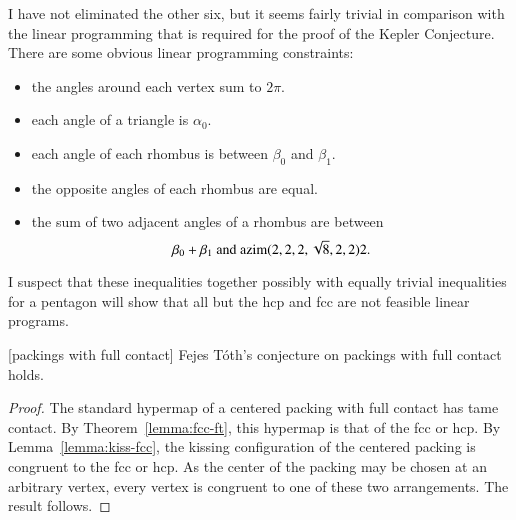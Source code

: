 \begin{note}%
I have not eliminated the other six, but it seems fairly trivial in comparison with the linear programming that is required for the proof of the Kepler Conjecture.  There are some obvious linear programming constraints:
\begin{itemize}
\item the angles around each vertex sum to $2\pi$.
\item each angle of a triangle is $\alpha_0$.
\item each angle of each rhombus is between $\beta_0$ and $\beta_1$.
\item the opposite angles of each rhombus are equal.
\item the sum of two adjacent angles of a rhombus are between
$$
\beta_0 + \beta_1 \hbox{ and } {\operatorname{azim}}(2,2,2,\sqrt8,2,2)2.
$$
\end{itemize}
I suspect that these inequalities together possibly with equally trivial inequalities for a pentagon will show that all but the hcp and fcc are not feasible linear programs.
\end{note}

\begin{theorem}[packings with full contact]  
Fejes T\'oth's conjecture on packings with full contact holds.
\end{theorem}
%

\begin{proof} The standard hypermap of a centered packing with full contact has tame contact.  By Theorem~\ref{lemma:fcc-ft}, this hypermap is that of the fcc or hcp.  By Lemma~\ref{lemma:kiss-fcc}, the kissing configuration of the centered packing is congruent to the fcc or hcp.  As the center of the packing may be chosen at an arbitrary vertex, every vertex is congruent to one of these two arrangements.  The result follows.
\end{proof}
%
%

